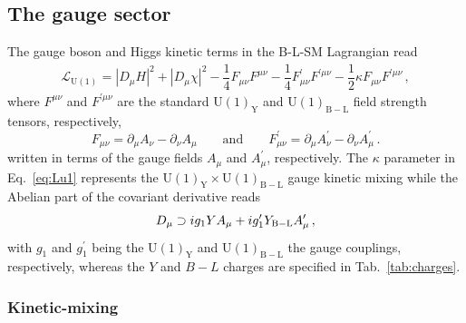 \documentclass[a4paper,11pt]{article}
\renewcommand{\(}{\left(}
\renewcommand{\)}{\right)}
\renewcommand{\[}{\left[}
\renewcommand{\]}{\right]}
\newcommand{\U}[1]{\mathrm{U}(1)_{\mathrm{#1}}}			%
\newcommand{\abs}[1]{\left| #1 \right| }
\begin{document}
\subsection{The gauge sector}

The gauge boson and Higgs kinetic terms in the B-L-SM Lagrangian read
\begin{equation}
\begin{aligned}
\mathcal{L}_{\U{}} =  \abs{D_\mu H}^2 + \abs{D_\mu \chi}^2 -\dfrac{1}{4} F_{\mu \nu} F^{\mu \nu} -\dfrac{1}{4} F^\prime_{\mu \nu} F^{\prime \mu \nu} -\dfrac{1}{2} \kappa F_{\mu \nu} F^{\prime \mu \nu}\,,
\end{aligned}
\label{eq:Lu1}
\end{equation}
where $F^{\mu \nu}$ and $F^{\prime \mu \nu}$ are the standard $\U{Y}$ and $\U{B-L}$ field strength tensors, respectively, 
\begin{equation}
	F_{\mu \nu} = \partial_\mu A_\nu - \partial_\nu A_\mu 
	\qquad
	\text{and}
	\qquad
	 F^\prime_{\mu \nu} = \partial_\mu A^\prime_\nu - \partial_\nu A^\prime_\mu\,.
	 \label{eq:Fmn}
\end{equation}
written in terms of the gauge fields $A_\mu$ and $A_\mu^\prime$, respectively.
The $\kappa$ parameter in Eq.~\eqref{eq:Lu1} represents the $\U{Y} \times \U{B-L}$ gauge kinetic mixing 
while the Abelian part of the covariant derivative reads
\begin{equation}
	D_\mu \supset i g_1 Y A_\mu + i g_1^\prime Y_{\rm B-L} A_\mu^\prime\,,
\end{equation}
with $g_1$ and $g_1^\prime$ being the $\U{Y}$ and $\U{B-L}$ the gauge couplings, respectively, 
whereas the $Y$ and $B-L$ charges are specified in Tab.~\ref{tab:charges}. 

\subsubsection{Kinetic-mixing}
\end{document}
